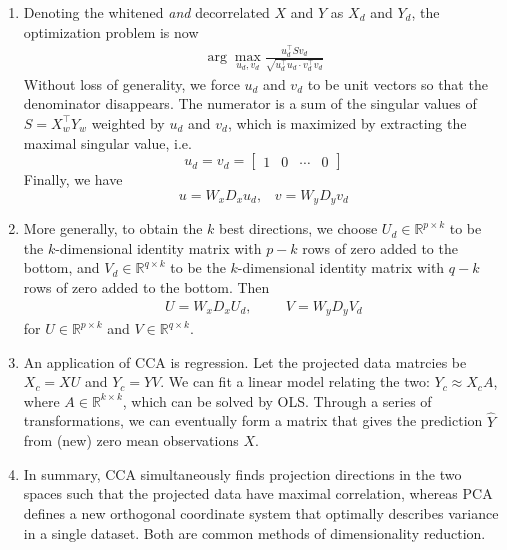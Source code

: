 \documentclass[10pt]{article}
\begin{document}
\begin{multicols}{2}
\begin{addmargin}[0.8em]{0.5em}
\begin{enumerate}[label=(\alph*)]
        \item Denoting the whitened \textit{and} decorrelated $X$ and $Y$ as $X_d$ and $Y_d$, the optimization problem is now
        \begin{align*}
        \arg\max_{u_d,v_d} \frac{u_d^\top S v_d}{\sqrt{u_d^\top u_d \cdot v_d^\top v_d }}
        \end{align*}
        Without loss of generality, we force $u_d$ and $v_d$ to be unit vectors so that the denominator disappears. The numerator is a sum of the singular values of $S=X_w^\top Y_w$ weighted by $u_d$ and $v_d$, which is maximized by extracting the maximal singular value, i.e. 
        $$
        u_d = v_d = \begin{bmatrix} 1 & 0 & \cdots & 0 \end{bmatrix}
        $$
        Finally, we have
        $$
        u = W_x D_x u_d, \hspace{10pt} v = W_y D_y v_d
        $$
        
        \item More generally, to obtain the $k$ best directions, we choose $U_d \in \mathbb{R}^{p \times k}$ to be the $k$-dimensional identity matrix with $p-k$ rows of zero added to the bottom, and $V_d \in \mathbb{R}^{q \times k}$ to be the $k$-dimensional identity matrix with $q-k$ rows of zero added to the bottom.
        Then
        \begin{align*}
            U = W_x D_x U_d, \hspace{1cm} V = W_y D_y V_d
        \end{align*}
        for $U \in \mathbb{R}^{p \times k}$ and $V \in \mathbb{R}^{q \times k}$.
        
        \item An application of CCA is regression. Let the projected data matrcies be $X_c = XU$ and $Y_c = YV$. We can fit a linear model relating the two: $Y_c \approx X_c A$, where $A\in \mathbb{R}^{k \times k}$, which can be solved by OLS. Through a series of transformations, we can eventually form a matrix that gives the prediction $\hat{Y}$ from (new) zero mean observations $X$.
        
        \item In summary, CCA simultaneously finds projection directions in the two spaces such that the projected data have maximal correlation, whereas PCA defines a new orthogonal coordinate system that optimally describes variance in a single dataset. Both are common methods of dimensionality reduction.
    \end{enumerate}       


\end{addmargin}
\end{multicols}
\end{document}

